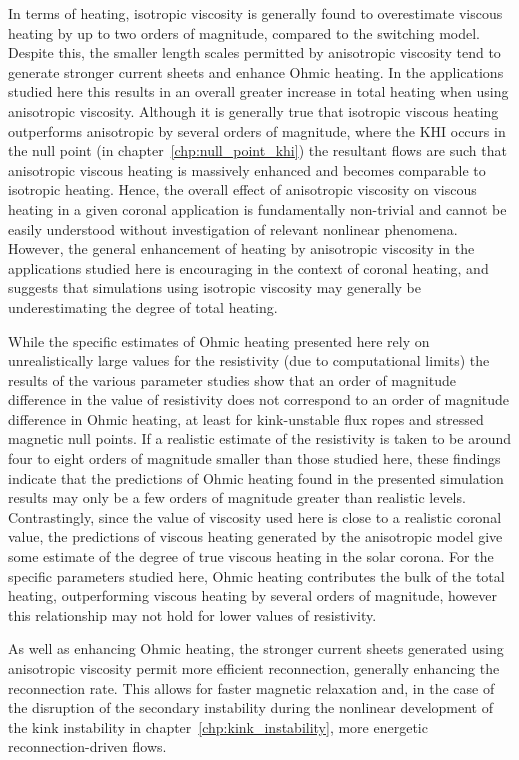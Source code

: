 In terms of heating, isotropic viscosity is generally found to overestimate viscous heating by up to two orders of magnitude, compared to the switching model. Despite this, the smaller length scales permitted by anisotropic viscosity tend to generate stronger current sheets and enhance Ohmic heating. In the applications studied here this results in an overall greater increase in total heating when using anisotropic viscosity. Although it is generally true that isotropic viscous heating outperforms anisotropic by several orders of magnitude, where the KHI occurs in the null point (in chapter~\ref{chp:null_point_khi}) the resultant flows are such that anisotropic viscous heating is massively enhanced and becomes comparable to isotropic heating. Hence, the overall effect of anisotropic viscosity on viscous heating in a given coronal application is fundamentally non-trivial and cannot be easily understood without investigation of relevant nonlinear phenomena. However, the general enhancement of heating by anisotropic viscosity in the applications studied here is encouraging in the context of coronal heating, and suggests that simulations using isotropic viscosity may generally be underestimating the degree of total heating.

While the specific estimates of Ohmic heating presented here rely on unrealistically large values for the resistivity (due to computational limits) the results of the various parameter studies show that an order of magnitude difference in the value of resistivity does not correspond to an order of magnitude difference in Ohmic heating, at least for kink-unstable flux ropes and stressed magnetic null points. If a realistic estimate of the resistivity is taken to be around four to eight orders of magnitude smaller than those studied here, these findings indicate that the predictions of Ohmic heating found in the presented simulation results may only be a few orders of magnitude greater than realistic levels. Contrastingly, since the value of viscosity used here is close to a realistic coronal value, the predictions of viscous heating generated by the anisotropic model give some estimate of the degree of true viscous heating in the solar corona. For the specific parameters studied here, Ohmic heating contributes the bulk of the total heating, outperforming viscous heating by several orders of magnitude, however this relationship may not hold for lower values of resistivity. 

As well as enhancing Ohmic heating, the stronger current sheets generated using anisotropic viscosity permit more efficient reconnection, generally enhancing the reconnection rate. This allows for faster magnetic relaxation and, in the case of the disruption of the secondary instability during the nonlinear development of the kink instability in chapter~\ref{chp:kink_instability}, more energetic reconnection-driven flows.

